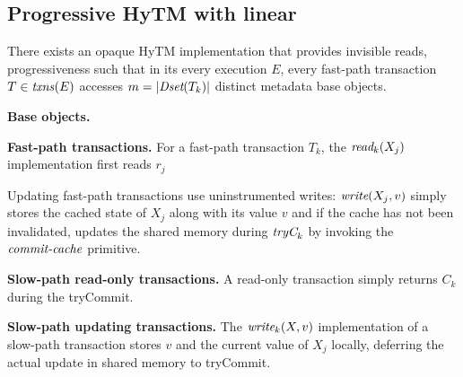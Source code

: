 \subsection{Progressive HyTM with linear}
%

%
\begin{theorem}
\label{th:inswrite}
There exists an opaque HyTM implementation that provides invisible reads, progressiveness
such that
in its every execution $E$, every fast-path transaction $T\in \ms{txns}(E)$
accesses $m=|\textit{Dset}(T_k)|$ distinct metadata base objects.
\end{theorem}
%
\vspace{1mm}\noindent\textbf{Base objects.}


\vspace{1mm}\noindent\textbf{Fast-path transactions.}
For a fast-path transaction $T_k$, the $\textit{read}_k(X_j)$ implementation first reads $r_j$ 

Updating fast-path transactions use uninstrumented writes:
$\textit{write} (X_j,v)$ simply stores the cached state of $X_j$ along with its value $v$ and
if the cache has not been invalidated, updates the shared memory
during $\textit{tryC}_k$ by invoking the $\ms{commit-cache}$ primitive.

\vspace{1mm}\noindent\textbf{Slow-path read-only transactions.}
A read-only transaction simply returns $C_k$ during the tryCommit.

\vspace{1mm}\noindent\textbf{Slow-path updating transactions.}
The $\textit{write}_k(X,v)$ implementation of a slow-path transaction stores
$v$ and the current value of $X_j$ locally, 
deferring the actual update in shared memory to tryCommit. 


